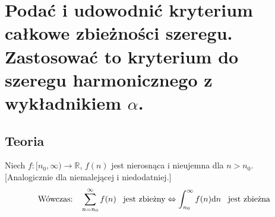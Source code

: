 \documentclass{article}
\numberwithin{equation}{section}
\theoremstyle{definition}
\theoremstyle{case}
\let\iff\Leftrightarrow
\begin{document}
\section{Podać i udowodnić kryterium całkowe zbieżności szeregu.
	Zastosować to kryterium do szeregu harmonicznego z wykładnikiem
	\texorpdfstring{$ \alpha $}{a}.
}
\subsection{Teoria}
Niech $f \colon [n_0,\infty) \to \mathbb{R}$, $f(n)$ jest nierosnąca i nieujemna dla $n> n_0$. %
[Analogicznie dla niemalejącej i niedodatniej.]
\begin{equation*}
	\textnormal{Wówczas: \enskip}
	\sum_{n={n_0}}^\infty f(n) \textnormal{ \enskip jest zbieżny}
	\iff
	\int_{n_0}^\infty f(n) \mathrm{d}n \textnormal{ \enskip jest zbieżna}
\end{equation*}
\end{document}
